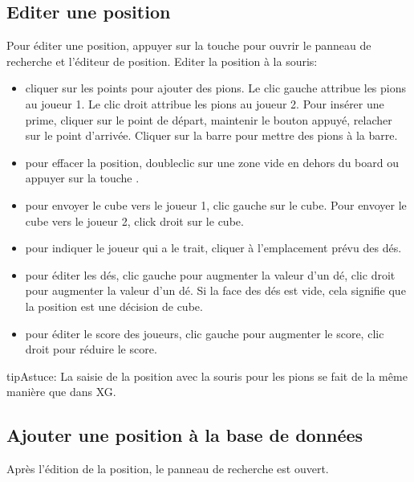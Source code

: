 \documentclass[letterpaper,10pt,french]{sphinxmanual}
\begin{document}
\subsection{Editer une position}
\label{\detokenize{guide_utilisateur:editer-une-position}}\label{\detokenize{guide_utilisateur:guide-edit-position}}
\sphinxAtStartPar
Pour éditer une position, appuyer sur la touche  pour ouvrir le
panneau de recherche et l’éditeur de position.
Editer la position à la souris:
\begin{itemize}
\item {} 
\sphinxAtStartPar
cliquer sur les points pour ajouter des pions. Le clic gauche attribue les
pions au joueur 1. Le clic droit attribue les pions au joueur 2. Pour insérer
une prime, cliquer sur le point de départ, maintenir le bouton appuyé,
relacher sur le point d’arrivée. Cliquer sur la barre pour mettre des
pions à la barre.

\item {} 
\sphinxAtStartPar
pour effacer la position, double\sphinxhyphen{}clic sur une zone vide en dehors du board ou
appuyer sur la touche .

\item {} 
\sphinxAtStartPar
pour envoyer le cube vers le joueur 1, clic gauche sur le cube. Pour envoyer
le cube vers le joueur 2, click droit sur le cube.

\item {} 
\sphinxAtStartPar
pour indiquer le joueur qui a le trait, cliquer à l’emplacement prévu des dés.

\item {} 
\sphinxAtStartPar
pour éditer les dés, clic gauche pour augmenter la valeur d’un dé, clic droit
pour augmenter la valeur d’un dé. Si la face des dés est vide, cela signifie
que la position est une décision de cube.

\item {} 
\sphinxAtStartPar
pour éditer le score des joueurs, clic gauche pour augmenter le score, clic
droit pour réduire le score.

\end{itemize}

\begin{sphinxadmonition}{tip}{Astuce:}
\sphinxAtStartPar
La saisie de la position avec la souris pour les pions se fait de la
même manière que dans XG.
\end{sphinxadmonition}


\subsection{Ajouter une position à la base de données}
\label{\detokenize{guide_utilisateur:ajouter-une-position-a-la-base-de-donnees}}
\sphinxAtStartPar
Après l’édition de la position, le panneau de recherche est ouvert.
\end{document}

